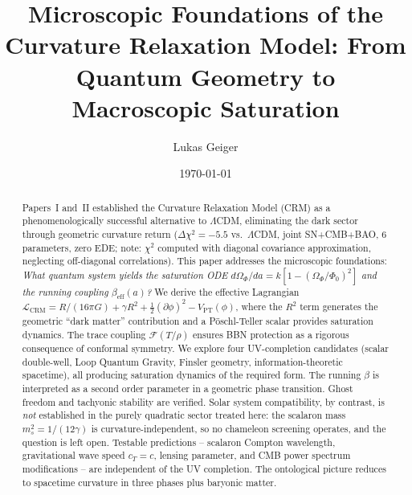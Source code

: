 \documentclass[aps,prd,twocolumn,superscriptaddress,nofootinbib]{revtex4-2}
\begin{document}

\title{Microscopic Foundations of the Curvature Relaxation Model: From Quantum Geometry to Macroscopic Saturation}

\author{Lukas Geiger}

\date{\today}

\begin{abstract}
Papers~I and~II established the Curvature Relaxation Model (CRM) as a phenomenologically successful alternative to $\Lambda$CDM, eliminating the dark sector through geometric curvature return ($\Delta\chi^2 = -5.5$ vs.\ $\Lambda$CDM, joint SN+CMB+BAO, 6 parameters, zero EDE; note: $\chi^2$ computed with diagonal covariance approximation, neglecting off-diagonal correlations). This paper addresses the microscopic foundations: \textit{What quantum system yields the saturation ODE $d\Omega_\Phi/da = k[1-(\Omega_\Phi/\Phi_0)^2]$ and the running coupling $\beta_{\mathrm{eff}}(a)$?} We derive the effective Lagrangian $\mathcal{L}_{\mathrm{CRM}} = R/(16\pi G) + \gamma R^2 + \frac{1}{2}(\partial\phi)^2 - V_{\mathrm{PT}}(\phi)$, where the $R^2$ term generates the geometric ``dark matter'' contribution and a P\"oschl-Teller scalar provides saturation dynamics. The trace coupling $\mathcal{F}(T/\rho)$ ensures BBN protection as a rigorous consequence of conformal symmetry. We explore four UV-completion candidates (scalar double-well, Loop Quantum Gravity, Finsler geometry, information-theoretic spacetime), all producing saturation dynamics of the required form. The running $\beta$ is interpreted as a second order parameter in a geometric phase transition. Ghost freedom and tachyonic stability are verified. Solar system compatibility, by contrast, is \textit{not} established in the purely quadratic sector treated here: the scalaron mass $m_s^2 = 1/(12\gamma)$ is curvature-independent, so no chameleon screening operates, and the question is left open. Testable predictions -- scalaron Compton wavelength, gravitational wave speed $c_T = c$, lensing parameter, and CMB power spectrum modifications -- are independent of the UV completion. The ontological picture reduces to spacetime curvature in three phases plus baryonic matter.
\end{abstract}

\end{document}
